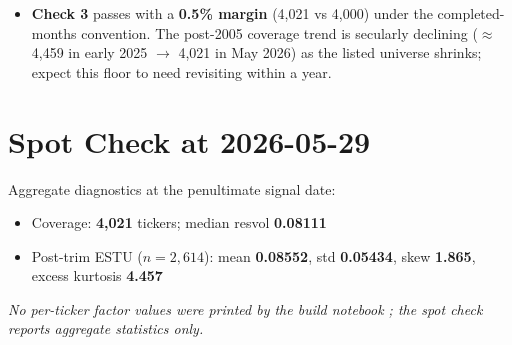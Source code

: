 \documentclass[11pt,a4paper]{article}
\newcommand{\NOTE}[1]{\textcolor{note}{\textit{#1}}}
\begin{document}
\begin{itemize}[leftmargin=*,topsep=2pt,itemsep=2pt]
  \item \textbf{Check 3} passes with a \textbf{0.5\% margin} (4{,}021 vs 4{,}000) under the completed-months convention. The post-2005 coverage trend is secularly declining ($\approx$4{,}459 in early 2025 $\to$ 4{,}021 in May 2026) as the listed universe shrinks; expect this floor to need revisiting within a year.
\end{itemize}

\section{Spot Check at 2026-05-29}

Aggregate diagnostics at the penultimate signal date:

\begin{itemize}[leftmargin=*,topsep=2pt,itemsep=2pt]
  \item Coverage: \textbf{4{,}021} tickers; median resvol \textbf{0.08111}
  \item Post-trim ESTU ($n=2{,}614$): mean \textbf{0.08552}, std \textbf{0.05434}, skew \textbf{1.865}, excess kurtosis \textbf{4.457}
\end{itemize}

\NOTE{No per-ticker factor values were printed by the build notebook
; the spot check reports aggregate statistics only.}
\end{document}
